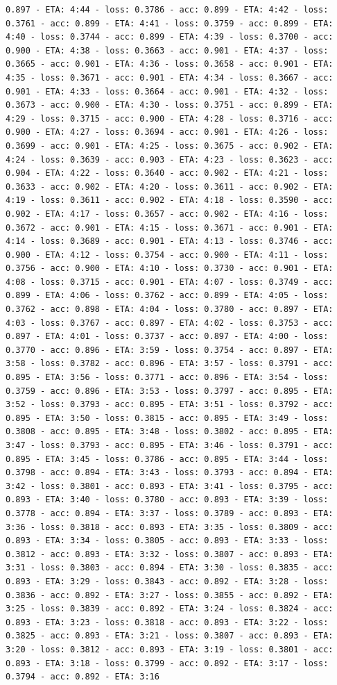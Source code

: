 \documentclass[11pt]{article}
\begin{document}
\begin{Verbatim}[commandchars=\\\{\}]
0.897 - ETA: 4:44 - loss: 0.3786 - acc: 0.899 - ETA: 4:42 - loss: 0.3761 - acc: 0.899 - ETA: 4:41 - loss: 0.3759 - acc: 0.899 - ETA: 4:40 - loss: 0.3744 - acc: 0.899 - ETA: 4:39 - loss: 0.3700 - acc: 0.900 - ETA: 4:38 - loss: 0.3663 - acc: 0.901 - ETA: 4:37 - loss: 0.3665 - acc: 0.901 - ETA: 4:36 - loss: 0.3658 - acc: 0.901 - ETA: 4:35 - loss: 0.3671 - acc: 0.901 - ETA: 4:34 - loss: 0.3667 - acc: 0.901 - ETA: 4:33 - loss: 0.3664 - acc: 0.901 - ETA: 4:32 - loss: 0.3673 - acc: 0.900 - ETA: 4:30 - loss: 0.3751 - acc: 0.899 - ETA: 4:29 - loss: 0.3715 - acc: 0.900 - ETA: 4:28 - loss: 0.3716 - acc: 0.900 - ETA: 4:27 - loss: 0.3694 - acc: 0.901 - ETA: 4:26 - loss: 0.3699 - acc: 0.901 - ETA: 4:25 - loss: 0.3675 - acc: 0.902 - ETA: 4:24 - loss: 0.3639 - acc: 0.903 - ETA: 4:23 - loss: 0.3623 - acc: 0.904 - ETA: 4:22 - loss: 0.3640 - acc: 0.902 - ETA: 4:21 - loss: 0.3633 - acc: 0.902 - ETA: 4:20 - loss: 0.3611 - acc: 0.902 - ETA: 4:19 - loss: 0.3611 - acc: 0.902 - ETA: 4:18 - loss: 0.3590 - acc: 0.902 - ETA: 4:17 - loss: 0.3657 - acc: 0.902 - ETA: 4:16 - loss: 0.3672 - acc: 0.901 - ETA: 4:15 - loss: 0.3671 - acc: 0.901 - ETA: 4:14 - loss: 0.3689 - acc: 0.901 - ETA: 4:13 - loss: 0.3746 - acc: 0.900 - ETA: 4:12 - loss: 0.3754 - acc: 0.900 - ETA: 4:11 - loss: 0.3756 - acc: 0.900 - ETA: 4:10 - loss: 0.3730 - acc: 0.901 - ETA: 4:08 - loss: 0.3715 - acc: 0.901 - ETA: 4:07 - loss: 0.3749 - acc: 0.899 - ETA: 4:06 - loss: 0.3762 - acc: 0.899 - ETA: 4:05 - loss: 0.3762 - acc: 0.898 - ETA: 4:04 - loss: 0.3780 - acc: 0.897 - ETA: 4:03 - loss: 0.3767 - acc: 0.897 - ETA: 4:02 - loss: 0.3753 - acc: 0.897 - ETA: 4:01 - loss: 0.3737 - acc: 0.897 - ETA: 4:00 - loss: 0.3770 - acc: 0.896 - ETA: 3:59 - loss: 0.3754 - acc: 0.897 - ETA: 3:58 - loss: 0.3782 - acc: 0.896 - ETA: 3:57 - loss: 0.3791 - acc: 0.895 - ETA: 3:56 - loss: 0.3771 - acc: 0.896 - ETA: 3:54 - loss: 0.3759 - acc: 0.896 - ETA: 3:53 - loss: 0.3797 - acc: 0.895 - ETA: 3:52 - loss: 0.3793 - acc: 0.895 - ETA: 3:51 - loss: 0.3792 - acc: 0.895 - ETA: 3:50 - loss: 0.3815 - acc: 0.895 - ETA: 3:49 - loss: 0.3808 - acc: 0.895 - ETA: 3:48 - loss: 0.3802 - acc: 0.895 - ETA: 3:47 - loss: 0.3793 - acc: 0.895 - ETA: 3:46 - loss: 0.3791 - acc: 0.895 - ETA: 3:45 - loss: 0.3786 - acc: 0.895 - ETA: 3:44 - loss: 0.3798 - acc: 0.894 - ETA: 3:43 - loss: 0.3793 - acc: 0.894 - ETA: 3:42 - loss: 0.3801 - acc: 0.893 - ETA: 3:41 - loss: 0.3795 - acc: 0.893 - ETA: 3:40 - loss: 0.3780 - acc: 0.893 - ETA: 3:39 - loss: 0.3778 - acc: 0.894 - ETA: 3:37 - loss: 0.3789 - acc: 0.893 - ETA: 3:36 - loss: 0.3818 - acc: 0.893 - ETA: 3:35 - loss: 0.3809 - acc: 0.893 - ETA: 3:34 - loss: 0.3805 - acc: 0.893 - ETA: 3:33 - loss: 0.3812 - acc: 0.893 - ETA: 3:32 - loss: 0.3807 - acc: 0.893 - ETA: 3:31 - loss: 0.3803 - acc: 0.894 - ETA: 3:30 - loss: 0.3835 - acc: 0.893 - ETA: 3:29 - loss: 0.3843 - acc: 0.892 - ETA: 3:28 - loss: 0.3836 - acc: 0.892 - ETA: 3:27 - loss: 0.3855 - acc: 0.892 - ETA: 3:25 - loss: 0.3839 - acc: 0.892 - ETA: 3:24 - loss: 0.3824 - acc: 0.893 - ETA: 3:23 - loss: 0.3818 - acc: 0.893 - ETA: 3:22 - loss: 0.3825 - acc: 0.893 - ETA: 3:21 - loss: 0.3807 - acc: 0.893 - ETA: 3:20 - loss: 0.3812 - acc: 0.893 - ETA: 3:19 - loss: 0.3801 - acc: 0.893 - ETA: 3:18 - loss: 0.3799 - acc: 0.892 - ETA: 3:17 - loss: 0.3794 - acc: 0.892 - ETA: 3:16 
\end{Verbatim}
\end{document}
